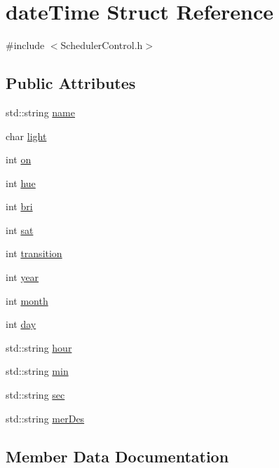 \hypertarget{structdate_time}{}\section{date\+Time Struct Reference}
\label{structdate_time}


{\ttfamily \#include $<$Scheduler\+Control.\+h$>$}

\subsection*{Public Attributes}
\begin{DoxyCompactItemize}
\item 
std\+::string \hyperlink{structdate_time_a41cb3f0c500fe4b0dcaed9eb5060a67a}{name}
\item 
char \hyperlink{structdate_time_a410eccce4f7fa017745d91b6d506aa91}{light}
\item 
int \hyperlink{structdate_time_a72fa6fd82aaa677df5fbc1111e8cec3e}{on}
\item 
int \hyperlink{structdate_time_af8b0a269b10808ee23580c36302565b9}{hue}
\item 
int \hyperlink{structdate_time_a3c1ea231c81bcb2342320b57c0cef3bd}{bri}
\item 
int \hyperlink{structdate_time_a1c206e75033573446af20f872af6ddf4}{sat}
\item 
int \hyperlink{structdate_time_ac8ace02ecb2dca3441224f4fde17b5b7}{transition}
\item 
int \hyperlink{structdate_time_a6941cd70fc3a57bca830cd1b62eb2826}{year}
\item 
int \hyperlink{structdate_time_a28451d7ddffe26ede3f38030ecc37a0b}{month}
\item 
int \hyperlink{structdate_time_a01df4912a566652a8c20a9e95e79354d}{day}
\item 
std\+::string \hyperlink{structdate_time_ab8e09ec72fd9dd7026beb7d730e1f455}{hour}
\item 
std\+::string \hyperlink{structdate_time_a8820636c9d8dee62b10129c5a5a53ea5}{min}
\item 
std\+::string \hyperlink{structdate_time_a9f45eba3d2d4d021511a66a23c5e487f}{sec}
\item 
std\+::string \hyperlink{structdate_time_af60a96840500291d1fd6c3adfba752a1}{mer\+Des}
\end{DoxyCompactItemize}


\subsection{Member Data Documentation}
\mbox{\label{structdate_time_a3c1ea231c81bcb2342320b57c0cef3bd}} 
